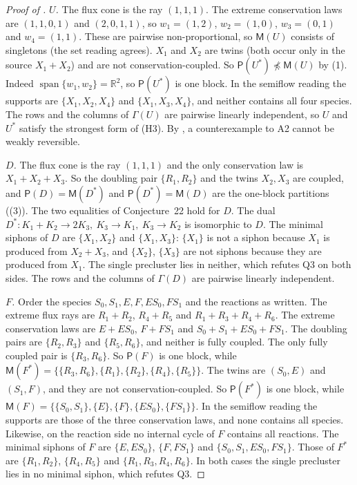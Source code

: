 \documentclass[11pt,a4paper]{report}
\providecommand{\R}{\mathbb{R}}
\newcommand{\spn}{\operatorname{span}}
\newcommand{\Pre}{\mathsf{P}}
\newcommand{\Mips}{\mathsf{M}}
\newcommand{\nrefi}{\not\preceq}
\begin{document}
\begin{proof}[Proof of ]
\emph{\(U\).} The flux cone is the ray \((1,1,1)\). The extreme conservation laws are \((1,1,0,1)\) and
\((2,0,1,1)\), so \(w_1=(1,2)\), \(w_2=(1,0)\), \(w_3=(0,1)\) and \(w_4=(1,1)\). These are pairwise non-proportional,
so \(\Mips(U)\) consists of singletons (the set reading agrees). \(X_1\) and \(X_2\) are twins (both occur only in the
source \(X_1+X_2\)) and are not conservation-coupled. So \(\Pre(U^*)\nrefi\Mips(U)\) by (1).
Indeed \(\spn\{w_1,w_2\}=\R^2\), so \(\Pre(U^*)\) is one block. In the semiflow reading the supports are
\(\{X_1,X_2,X_4\}\) and \(\{X_1,X_3,X_4\}\), and neither contains all four species. The rows and the columns of
\(\Gamma(U)\) are pairwise linearly independent, so \(U\) and \(U^*\) satisfy the strongest form of (H3). By
, a counterexample to A2 cannot be weakly reversible.

\emph{\(D\).} The flux cone is the ray \((1,1,1)\) and the only conservation law is \(X_1+X_2+X_3\). So the doubling
pair \(\{R_1,R_2\}\) and the twins \(X_2,X_3\) are coupled, and \(\Pre(D)=\Mips(D^*)\) and \(\Pre(D^*)=\Mips(D)\) are
the one-block partitions ((3)). The two equalities of Conjecture~22 hold for \(D\). The dual
\(D^*\colon K_1+K_2\to2K_3,\ K_3\to K_1,\ K_3\to K_2\) is isomorphic to \(D\). The minimal siphons of \(D\) are
\(\{X_1,X_2\}\) and \(\{X_1,X_3\}\): \(\{X_1\}\) is not a siphon because \(X_1\) is produced from \(X_2+X_3\), and
\(\{X_2\}\), \(\{X_3\}\) are not siphons because they are produced from \(X_1\). The single precluster lies in neither,
which refutes Q3 on both sides. The rows and the columns of \(\Gamma(D)\) are pairwise linearly independent.

\emph{\(F\).} Order the species \(S_0,S_1,E,F,ES_0,FS_1\) and the reactions as written. The extreme flux rays are
\(R_1+R_2\), \(R_4+R_5\) and \(R_1+R_3+R_4+R_6\). The extreme conservation laws are \(E+ES_0\), \(F+FS_1\) and
\(S_0+S_1+ES_0+FS_1\). The doubling pairs are \(\{R_2,R_3\}\) and \(\{R_5,R_6\}\), and neither is fully coupled. The
only fully coupled pair is \(\{R_3,R_6\}\). So \(\Pre(F)\) is one block, while
\(\Mips(F^*)=\{\{R_3,R_6\},\{R_1\},\{R_2\},\{R_4\},\{R_5\}\}\). The twins are \((S_0,E)\) and \((S_1,F)\), and they are
not conservation-coupled. So \(\Pre(F^*)\) is one block, while \(\Mips(F)=\{\{S_0,S_1\},\{E\},\{F\},\{ES_0\},\{FS_1\}\}\).
In the semiflow reading the supports are those of the three conservation laws, and none contains all species.
Likewise, on the reaction side no internal cycle of \(F\) contains all reactions. The minimal siphons of \(F\) are \(\{E,ES_0\}\), \(\{F,FS_1\}\) and \(\{S_0,S_1,ES_0,FS_1\}\). Those of \(F^*\) are
\(\{R_1,R_2\}\), \(\{R_4,R_5\}\) and \(\{R_1,R_3,R_4,R_6\}\). In both cases the single precluster lies in no minimal
siphon, which refutes Q3.


\end{proof}
\end{document}
